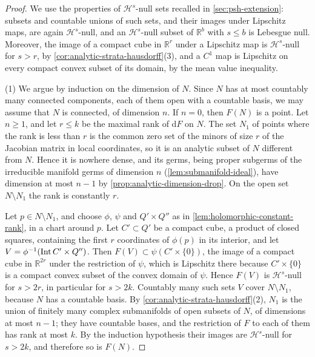 \begin{proof}
We use the properties of $\mathcal H^s$-null sets recalled in \cref{sec:psh-extension}: subsets and countable unions of such sets, and their images under Lipschitz maps, are again $\mathcal H^s$-null, and an $\mathcal H^s$-null subset of $\mathbb R^b$ with $s\leq b$ is Lebesgue null. Moreover, the image of a compact cube in $\mathbb R^r$ under a Lipschitz map is $\mathcal H^s$-null for $s>r$, by \cref{cor:analytic-strata-hausdorff}(3), and a $C^1$ map is Lipschitz on every compact convex subset of its domain, by the mean value inequality.

(1) We argue by induction on the dimension of $N$. Since $N$ has at most countably many connected components, each of them open with a countable basis, we may assume that $N$ is connected, of dimension $n$. If $n=0$, then $F(N)$ is a point. Let $n\geq1$, and let $r\leq k$ be the maximal rank of $\mathrm dF$ on $N$. The set $N_1$ of points where the rank is less than $r$ is the common zero set of the minors of size $r$ of the Jacobian matrix in local coordinates, so it is an analytic subset of $N$ different from $N$. Hence it is nowhere dense, and its germs, being proper subgerms of the irreducible manifold germs of dimension $n$ (\cref{lem:submanifold-ideal}), have dimension at most $n-1$ by \cref{prop:analytic-dimension-drop}. On the open set $N\setminus N_1$ the rank is constantly $r$.

Let $p\in N\setminus N_1$, and choose $\phi$, $\psi$ and $Q'\times Q''$ as in \cref{lem:holomorphic-constant-rank}, in a chart around $p$. Let $C'\subset Q'$ be a compact cube, a product of closed squares, containing the first $r$ coordinates of $\phi(p)$ in its interior, and let $V=\phi^{-1}(\operatorname{Int} C'\times Q'')$. Then $F(V)\subset\psi(C'\times\{0\})$, the image of a compact cube in $\mathbb R^{2r}$ under the restriction of $\psi$, which is Lipschitz there because $C'\times\{0\}$ is a compact convex subset of the convex domain of $\psi$. Hence $F(V)$ is $\mathcal H^s$-null for $s>2r$, in particular for $s>2k$. Countably many such sets $V$ cover $N\setminus N_1$, because $N$ has a countable basis. By \cref{cor:analytic-strata-hausdorff}(2), $N_1$ is the union of finitely many complex submanifolds of open subsets of $N$, of dimensions at most $n-1$; they have countable bases, and the restriction of $F$ to each of them has rank at most $k$. By the induction hypothesis their images are $\mathcal H^s$-null for $s>2k$, and therefore so is $F(N)$.


\end{proof}
